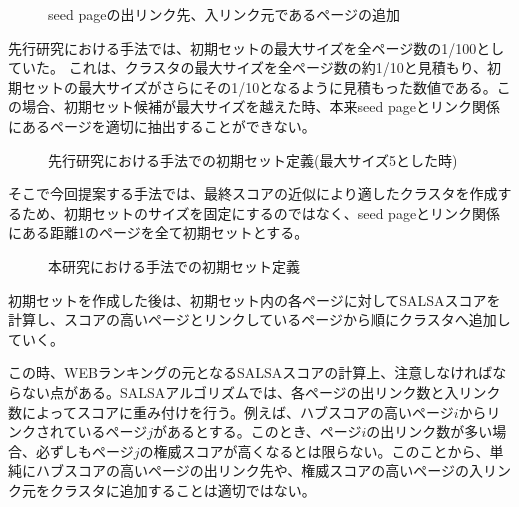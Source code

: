 \documentclass[a4paper,11pt]{jreport}
\begin{document}
\begin{figure}[htbp]
\begin{center}
\end{center}
\caption{seed pageの出リンク先、入リンク元であるページの追加}
\label{figure:sample}
\end{figure}

\newpage

先行研究における手法では、初期セットの最大サイズを全ページ数の1/100としていた。
これは、クラスタの最大サイズを全ページ数の約1/10と見積もり、初期セットの最大サイズがさらにその1/10となるように見積もった数値である。この場合、初期セット候補が最大サイズを越えた時、本来seed pageとリンク関係にあるページを適切に抽出することができない。

\begin{figure}[htbp]
\begin{center}
\end{center}
\caption{先行研究における手法での初期セット定義(最大サイズ5とした時)}
\label{figure:sample}
\end{figure}

そこで今回提案する手法では、最終スコアの近似により適したクラスタを作成するため、初期セットのサイズを固定にするのではなく、seed pageとリンク関係にある距離1のページを全て初期セットとする。

\begin{figure}[htbp]
\begin{center}
\end{center}
\caption{本研究における手法での初期セット定義}
\label{figure:sample}
\end{figure}

\newpage

初期セットを作成した後は、初期セット内の各ページに対してSALSAスコアを計算し、スコアの高いページとリンクしているページから順にクラスタへ追加していく。

この時、WEBランキングの元となるSALSAスコアの計算上、注意しなければならない点がある。SALSAアルゴリズムでは、各ページの出リンク数と入リンク数によってスコアに重み付けを行う。例えば、ハブスコアの高いページ$i$からリンクされているページ$j$があるとする。このとき、ページ$i$の出リンク数が多い場合、必ずしもページ$j$の権威スコアが高くなるとは限らない。このことから、単純にハブスコアの高いページの出リンク先や、権威スコアの高いページの入リンク元をクラスタに追加することは適切ではない。
\end{document}
